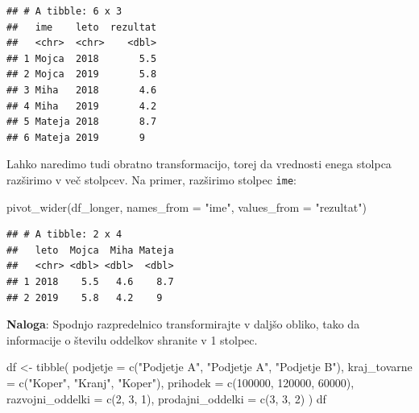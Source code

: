 \documentclass[
]{book}
\newenvironment{Shaded}{\begin{snugshade}}{\end{snugshade}}
\newcommand{\AttributeTok}[1]{\textcolor[rgb]{0.77,0.63,0.00}{#1}}
\newcommand{\DecValTok}[1]{\textcolor[rgb]{0.00,0.00,0.81}{#1}}
\newcommand{\FunctionTok}[1]{\textcolor[rgb]{0.00,0.00,0.00}{#1}}
\newcommand{\NormalTok}[1]{#1}
\newcommand{\OtherTok}[1]{\textcolor[rgb]{0.56,0.35,0.01}{#1}}
\newcommand{\StringTok}[1]{\textcolor[rgb]{0.31,0.60,0.02}{#1}}
\begin{document}
\begin{verbatim}
## # A tibble: 6 x 3
##   ime    leto  rezultat
##   <chr>  <chr>    <dbl>
## 1 Mojca  2018       5.5
## 2 Mojca  2019       5.8
## 3 Miha   2018       4.6
## 4 Miha   2019       4.2
## 5 Mateja 2018       8.7
## 6 Mateja 2019       9
\end{verbatim}

Lahko naredimo tudi obratno transformacijo, torej da vrednosti enega stolpca razširimo v več stolpcev. Na primer, razširimo stolpec \texttt{ime}:

\begin{Shaded}
\begin{Highlighting}[]
\FunctionTok{pivot\_wider}\NormalTok{(df\_longer, }\AttributeTok{names\_from =} \StringTok{"ime"}\NormalTok{, }\AttributeTok{values\_from =} \StringTok{"rezultat"}\NormalTok{)}
\end{Highlighting}
\end{Shaded}

\begin{verbatim}
## # A tibble: 2 x 4
##   leto  Mojca  Miha Mateja
##   <chr> <dbl> <dbl>  <dbl>
## 1 2018    5.5   4.6    8.7
## 2 2019    5.8   4.2    9
\end{verbatim}

\textbf{Naloga}: Spodnjo razpredelnico transformirajte v daljšo obliko, tako da informacije o številu oddelkov shranite v 1 stolpec.

\begin{Shaded}
\begin{Highlighting}[]
\NormalTok{df }\OtherTok{\textless{}{-}} \FunctionTok{tibble}\NormalTok{(}
  \AttributeTok{podjetje =} \FunctionTok{c}\NormalTok{(}\StringTok{"Podjetje A"}\NormalTok{, }\StringTok{"Podjetje A"}\NormalTok{, }\StringTok{"Podjetje B"}\NormalTok{),}
  \AttributeTok{kraj\_tovarne =} \FunctionTok{c}\NormalTok{(}\StringTok{"Koper"}\NormalTok{, }\StringTok{"Kranj"}\NormalTok{, }\StringTok{"Koper"}\NormalTok{),}
  \AttributeTok{prihodek =} \FunctionTok{c}\NormalTok{(}\DecValTok{100000}\NormalTok{, }\DecValTok{120000}\NormalTok{, }\DecValTok{60000}\NormalTok{),}
  \AttributeTok{razvojni\_oddelki =} \FunctionTok{c}\NormalTok{(}\DecValTok{2}\NormalTok{, }\DecValTok{3}\NormalTok{, }\DecValTok{1}\NormalTok{),}
  \AttributeTok{prodajni\_oddelki =} \FunctionTok{c}\NormalTok{(}\DecValTok{3}\NormalTok{, }\DecValTok{3}\NormalTok{, }\DecValTok{2}\NormalTok{)}
\NormalTok{)}
\NormalTok{df}
\end{Highlighting}
\end{Shaded}
\end{document}
